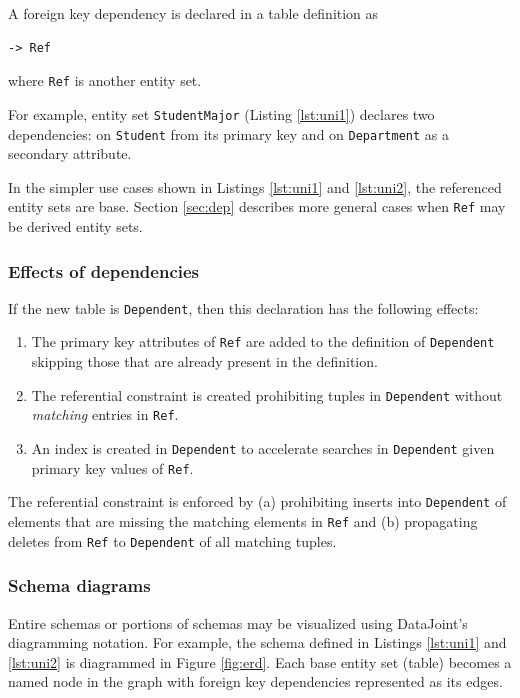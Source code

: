 \documentclass[letter,10pt]{article}
\newcommand{\datajoint}{DataJoint\xspace}
\begin{document}
A foreign key dependency is declared in a table definition as 
\begin{lstlisting}
-> Ref 
\end{lstlisting}
where \lstinline$Ref$ is another entity set.

For example, entity set \lstinline$StudentMajor$ (Listing \ref{lst:uni1}) declares two dependencies: on \lstinline$Student$ from its primary key and on \lstinline$Department$ as a secondary attribute.

In the simpler use cases shown in Listings \ref{lst:uni1} and \ref{lst:uni2}, the referenced entity sets are base. 
Section \ref{sec:dep} describes more general cases when \lstinline$Ref$ may be derived entity sets.

\subsubsection{Effects of dependencies}\label{sec:effects}
If the new table is \lstinline$Dependent$, then this declaration has the following effects: 
\begin{enumerate}
\item The primary key attributes of \lstinline$Ref$ are added to the definition of \lstinline$Dependent$ skipping those that are already present in the definition.
\item The referential constraint is created prohibiting tuples in \lstinline$Dependent$ without \emph{matching} entries in \lstinline$Ref$.
\item An index is created in \lstinline$Dependent$ to accelerate searches in \lstinline$Dependent$ given primary key values of \lstinline$Ref$.
\end{enumerate}

The referential constraint is enforced by (a) prohibiting inserts into \lstinline$Dependent$ of elements that are missing the matching elements in \lstinline$Ref$ and (b) propagating deletes from \lstinline$Ref$ to \lstinline$Dependent$ of all matching tuples.

\subsubsection{Schema diagrams}\label{sec:diag}
Entire schemas or portions of schemas may be visualized using \datajoint's diagramming notation.  
For example, the schema defined in Listings \ref{lst:uni1} and \ref{lst:uni2} is diagrammed in Figure \ref{fig:erd}. 
Each base entity set (table) becomes a named node in the graph with foreign key dependencies represented as its edges. 
\end{document}
